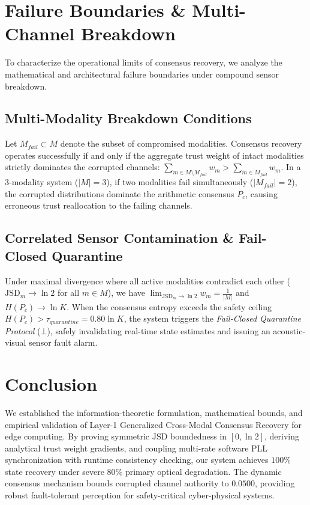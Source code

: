 \documentclass[conference]{IEEEtran}
\begin{document}
\section{Failure Boundaries \& Multi-Channel Breakdown}
To characterize the operational limits of consensus recovery, we analyze the mathematical and architectural failure boundaries under compound sensor breakdown.

\subsection{Multi-Modality Breakdown Conditions}
Let $M_{fail} \subset M$ denote the subset of compromised modalities. Consensus recovery operates successfully if and only if the aggregate trust weight of intact modalities strictly dominates the corrupted channels: $\sum_{m \in M \setminus M_{fail}} w_m > \sum_{m \in M_{fail}} w_m$. In a 3-modality system ($|M|=3$), if two modalities fail simultaneously ($|M_{fail}|=2$), the corrupted distributions dominate the arithmetic consensus $P_c$, causing erroneous trust reallocation to the failing channels.

\subsection{Correlated Sensor Contamination \& Fail-Closed Quarantine}
Under maximal divergence where all active modalities contradict each other ($\mathrm{JSD}_m \to \ln 2$ for all $m \in M$), we have $\lim_{\mathrm{JSD}_m \to \ln 2} w_m = \frac{1}{|M|}$ and $H(P_c) \to \ln K$. When the consensus entropy exceeds the safety ceiling $H(P_c) > \tau_{quarantine} = 0.80\ln K$, the system triggers the \textit{Fail-Closed Quarantine Protocol} ($\bot$), safely invalidating real-time state estimates and issuing an acoustic-visual sensor fault alarm.

\section{Conclusion}
We established the information-theoretic formulation, mathematical bounds, and empirical validation of Layer-1 Generalized Cross-Modal Consensus Recovery for edge computing. By proving symmetric $\mathrm{JSD}$ boundedness in $[0, \ln 2]$, deriving analytical trust weight gradients, and coupling multi-rate software PLL synchronization with runtime consistency checking, our system achieves $100\%$ state recovery under severe $80\%$ primary optical degradation. The dynamic consensus mechanism bounds corrupted channel authority to $0.0500$, providing robust fault-tolerant perception for safety-critical cyber-physical systems.
\end{document}
